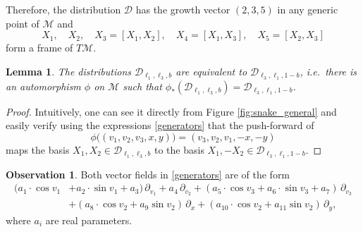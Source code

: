 \documentclass{amsart}
\theoremstyle{plain}
\newtheorem{lemma}[theorem]{Lemma}
\theoremstyle{definition}
\newtheorem*{observation}{Observation}
\theoremstyle{remark}
\newcommand{\mc}[1]{\mathcal{#1}}
\begin{document}
Therefore, the distribution $\mc{D}$ has the growth vector $(2,3,5)$ in any generic point of $\mc{M}$ and
\begin{equation}\label{frame}
    X_1,\quad X_2,\quad X_3 = [X_1, X_2], \quad X_4 = [X_1,X_3], \quad X_5 = [X_2,X_3]
\end{equation}
form a frame of $T\mc{M}$.
%
\begin{lemma} \label{lemma:symmetry}
    The distributions $\mc{D}_{\ell_1,\ell_3,b}$ are equivalent to $\mc{D}_{\ell_3,\ell_1,1-b}$, i.e.~there is an automorphism $\phi$ on $\mc{M}$ such that $\phi_* (\mc{D}_{\ell_1,\ell_3,b}) = \mc{D}_{\ell_3,\ell_1,1-b}$.
\end{lemma}
\begin{proof}
    Intuitively, one can see it directly from Figure \ref{fig:snake_general} and easily verify using the expressions \eqref{generators} that the push-forward of
    \[ \phi\big((v_1,v_2,v_3,x,y)\big) = (v_3,v_2,v_1,-x,-y) \]
    maps the basis $X_1, X_2 \in \mc{D}_{\ell_1, \ell_3, b}$ to the basis $X_1, -X_2 \in \mc{D}_{\ell_3, \ell_1, 1-b}$.
\end{proof}
%
\begin{observation}
Both vector fields in \eqref{generators} are of the form
\begin{equation}\label{VF_closed_form}
\begin{aligned}
    (a_1 \cdot \cos v_1 &+ a_2 \cdot \sin v_1 + a_3) \,\partial_{v_1} + a_4 \,\partial_{v_2} + (a_5 \cdot \cos v_3 + a_6 \cdot \sin v_3 + a_7) \,\partial_{v_3}\\
    &+ (a_8 \cdot \cos v_2 + a_9 \sin v_2) \,\partial_x + (a_{10} \cdot \cos v_2 + a_{11} \sin v_2) \,\partial_y,
\end{aligned}
\end{equation}
where $a_i$ are real parameters.
\end{observation}
\end{document}

